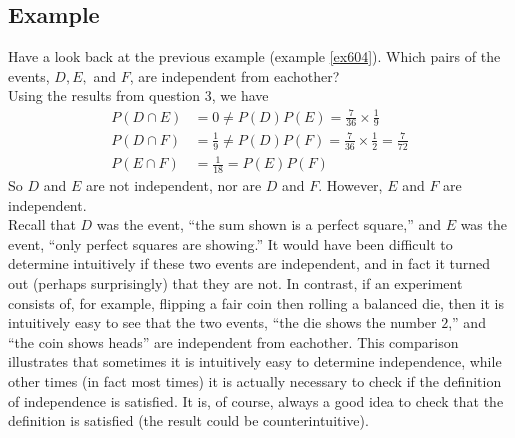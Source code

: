 \subsection{Example}
Have a look back at the previous example (example \ref{ex604}). Which pairs of the events, $D,E,$ and $F$, are independent from eachother? \\

Using the results from question 3, we have
\begin{align*}
P(D \cap E) & = 0 \neq P(D)P(E) = \frac{7}{36}\times\frac{1}{9} \\
P(D \cap F) & = \frac{1}{9} \neq P(D)P(F) = \frac{7}{36}\times\frac{1}{2} = \frac{7}{72} \\
P(E \cap F) & = \frac{1}{18} = P(E)P(F)
\end{align*}
So $D$ and $E$ are not independent, nor are $D$ and $F$. However, $E$ and $F$ are independent. \\

\noindent Recall that $D$ was the event, ``the sum shown is a perfect square,'' and $E$ was the event, ``only perfect squares are showing.'' It would have been difficult to determine intuitively if these two events are independent, and in fact it turned out (perhaps surprisingly) that they are not. In contrast, if an experiment consists of, for example, flipping a fair coin then rolling a balanced die, then it is intuitively easy to see that the two events, ``the die shows the number $2$,'' and ``the coin shows heads'' are independent from eachother. This comparison illustrates that sometimes it is intuitively easy to determine independence, while other times (in fact most times) it is actually necessary to check if the definition of independence is satisfied. It is, of course, always a good idea to check that the definition is satisfied (the result could be counterintuitive).

